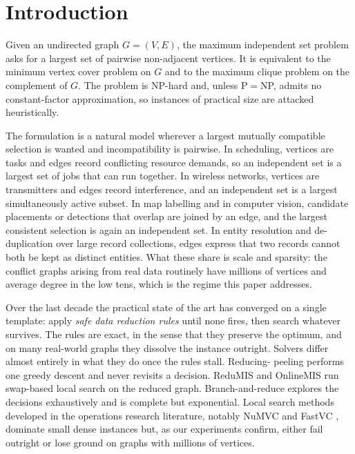 \documentclass[preprint,12pt]{elsarticle}
\theoremstyle{definition}
\begin{document}
\section{Introduction}
\label{sec:intro}

Given an undirected graph $G=(V,E)$, the maximum independent set problem asks
for a largest set of pairwise non-adjacent vertices. It is equivalent to the
minimum vertex cover problem on $G$ and to the maximum clique problem on the
complement of $G$. The problem is NP-hard and, unless P${}={}$NP, admits no
constant-factor approximation, so instances of practical size are attacked
heuristically.

The formulation is a natural model wherever a largest mutually compatible
selection is wanted and incompatibility is pairwise. In scheduling, vertices are
tasks and edges record conflicting resource demands, so an independent set is a
largest set of jobs that can run together. In wireless networks, vertices are
transmitters and edges record interference, and an independent set is a largest
simultaneously active subset. In map labelling and in computer vision,
candidate placements or detections that overlap are joined by an edge, and the
largest consistent selection is again an independent set. In entity resolution
and de-duplication over large record collections, edges express that two records
cannot both be kept as distinct entities. What these share is scale and
sparsity: the conflict graphs arising from real data routinely have millions of
vertices and average degree in the low tens, which is the regime this paper
addresses.

Over the last decade the practical state of the art has converged on a single
template: apply \emph{safe data reduction rules} until none fires, then search
whatever survives. The rules are exact, in the sense that they preserve the
optimum, and on many real-world graphs they dissolve the instance outright.
Solvers differ almost entirely in what they do once the rules stall. Reducing-
peeling \cite{chang2017} performs one greedy descent and never revisits a
decision. ReduMIS \cite{lamm2017} and OnlineMIS \cite{dahlum2016} run swap-based
local search on the reduced graph. Branch-and-reduce \cite{akiba2016} explores
the decisions exhaustively and is complete but exponential. Local search
methods developed in the operations research literature, notably NuMVC
\cite{cai2013numvc} and FastVC \cite{cai2017fastvc}, dominate small dense
instances but, as our experiments confirm, either fail outright or lose ground
on graphs with millions of vertices.
\end{document}
